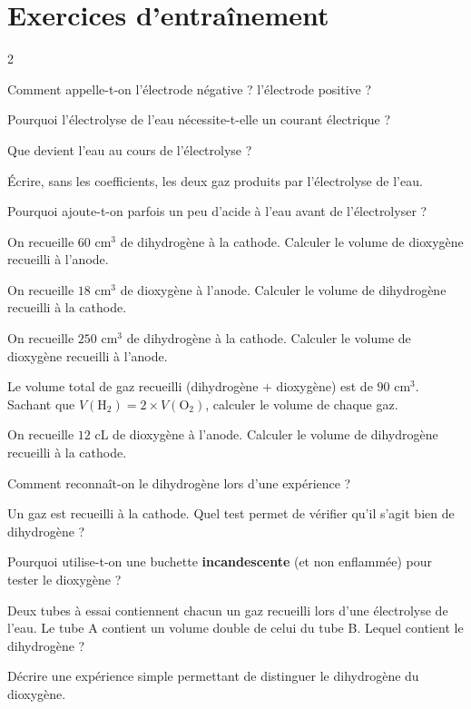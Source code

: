 \section{Exercices d'entraînement}
\begin{multicols}{2}

\exo{} Comment appelle-t-on l'électrode négative ? l'électrode positive ?

\exo{} Pourquoi l'électrolyse de l'eau nécessite-t-elle un courant électrique ?

\exo{} Que devient l'eau au cours de l'électrolyse ?

\exo{} Écrire, sans les coefficients, les deux gaz produits par l'électrolyse de
l'eau.

\exo{} Pourquoi ajoute-t-on parfois un peu d'acide à l'eau avant de l'électrolyser
?

\exo{} On recueille $60$ cm$^{3}$ de dihydrogène à la cathode. Calculer le volume
de dioxygène recueilli à l'anode.

\exo{} On recueille $18$ cm$^{3}$ de dioxygène à l'anode. Calculer le volume de
dihydrogène recueilli à la cathode.

\exo{} On recueille $250$ cm$^{3}$ de dihydrogène à la cathode. Calculer le volume
de dioxygène recueilli à l'anode.

\exo{} Le volume total de gaz recueilli (dihydrogène $+$ dioxygène) est de $90$
cm$^{3}$. Sachant que $V(\mathrm{H_2})=2\times V(\mathrm{O_2})$, calculer le volume de
chaque gaz.

\exo{} On recueille $12$ cL de dioxygène à l'anode. Calculer le volume de
dihydrogène recueilli à la cathode.

\exo{} Comment reconnaît-on le dihydrogène lors d'une expérience ?

\exo{} Un gaz est recueilli à la cathode. Quel test permet de vérifier qu'il
s'agit bien de dihydrogène ?

\exo{} Pourquoi utilise-t-on une buchette \textbf{incandescente} (et non
enflammée) pour tester le dioxygène ?

\exo{} Deux tubes à essai contiennent chacun un gaz recueilli lors d'une
électrolyse de l'eau. Le tube A contient un volume double de celui du tube B. Lequel
contient le dihydrogène ?

\exo{} Décrire une expérience simple permettant de distinguer le dihydrogène du
dioxygène.


\end{multicols}
